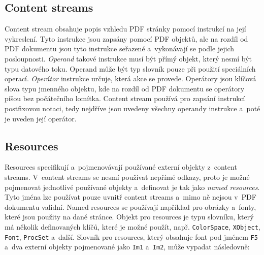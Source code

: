 

\subsection*{Content streams} \label{content_streams}
Content stream obsahuje popis vzhledu PDF stránky pomocí instrukcí na její
vykreslení. Tyto instrukce jsou zapsány pomocí PDF objektů, ale na rozdíl od
PDF dokumentu jsou tyto instrukce seřazené a~vykonávají se podle jejich
posloupnosti. \emph{Operand} takové instrukce musí být přímý objekt, který 
nesmí být typu datového toku. Operand může být typ slovník pouze při použití
speciálních operací. \emph{Operátor} instrukce určuje, která akce se provede.
Operátory jsou klíčová slova typu jmenného objektu, kde na rozdíl od PDF dokumentu
se operátory píšou bez počátečního lomítka. Content stream používá pro zapsání
instrukcí postfixovou notaci, tedy nejdříve jsou uvedeny všechny operandy instrukce
a~poté je uveden její operátor.


\subsection*{Resources} \label{resources}
Resources specifikují a~pojmenovávají používané externí objekty z~content streams.
V~content streams se nesmí používat nepřímé odkazy, proto je možné pojmenovat
jednotlivé používané objekty a~definovat je tak jako \emph{named resources}.
Tyto jména lze používat pouze uvnitř content streams a~mimo ně nejsou v~PDF
dokumentu validní. Named resources se používají například pro obrázky a~fonty,
které jsou použity na dané stránce. Objekt pro resources je typu slovníku, který
má několik definovaných klíčů, které je možné použít, např. \texttt{ColorSpace}, 
\texttt{XObject}, \texttt{Font}, \texttt{ProcSet} a~další. Slovník pro resources,
který obsahuje font pod jménem \texttt{F5} a~dva externí objekty pojmenované jako
\texttt{Im1} a~\texttt{Im2}, může vypadat následovně:



